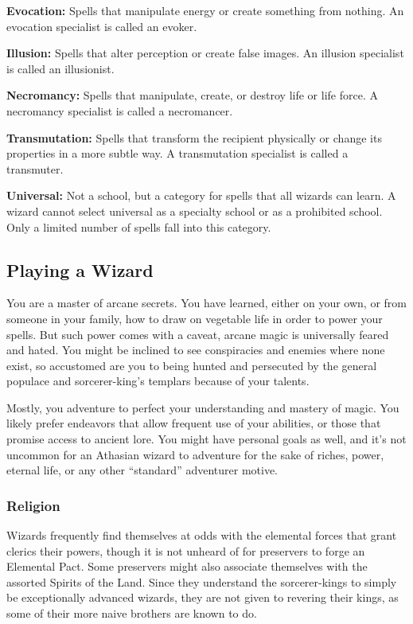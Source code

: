 \textbf{Evocation:} Spells that manipulate energy or create something from nothing. An evocation specialist is called an evoker.

\textbf{Illusion:} Spells that alter perception or create false images. An illusion specialist is called an illusionist.

\textbf{Necromancy:} Spells that manipulate, create, or destroy life or life force. A necromancy specialist is called a necromancer.

\textbf{Transmutation:} Spells that transform the recipient physically or change its properties in a more subtle way. A transmutation specialist is called a transmuter.

\textbf{Universal:} Not a school, but a category for spells that all wizards can learn. A wizard cannot select universal as a specialty school or as a prohibited school. Only a limited number of spells fall into this category.

\subsection{Playing a Wizard}

You are a master of arcane secrets. You have learned, either on your own, or from someone in your family, how to draw on vegetable life in order to power your spells. But such power comes with a caveat, arcane magic is universally feared and hated. You might be inclined to see conspiracies and enemies where none exist, so accustomed are you to being hunted and persecuted by the general populace and sorcerer-king's templars because of your talents.

Mostly, you adventure to perfect your understanding and mastery of magic. You likely prefer endeavors that allow frequent use of your abilities, or those that promise access to ancient lore. You might have personal goals as well, and it's not uncommon for an Athasian wizard to adventure for the sake of riches, power, eternal life, or any other ``standard'' adventurer motive.

\subsubsection{Religion}

Wizards frequently find themselves at odds with the elemental forces that grant clerics their powers, though it is not unheard of for preservers to forge an Elemental Pact. Some preservers might also associate themselves with the assorted Spirits of the Land. Since they understand the sorcerer-kings to simply be exceptionally advanced wizards, they are not given to revering their kings, as some of their more naive brothers are known to do.

